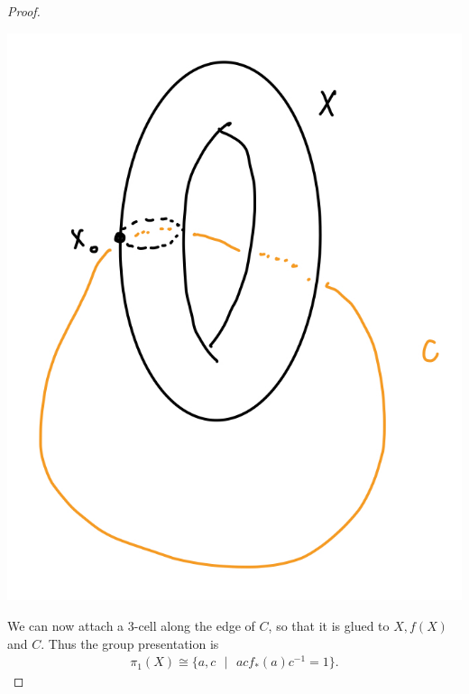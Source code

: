 \documentclass[12pt]{article}
\begin{document}
\begin{proof}
  \par \begin{center} \includegraphics[scale=.2]{5-2.jpg} \end{center} 
  \par We can now attach a 3-cell along the edge of $C$, so that it is glued to $X ,f(X)$ and $C$. Thus the group presentation is 
  \begin{align*}
    \pi_1(X) \cong \{ a,c \text{ }|\text{ } acf_*(a)c^{-1}=1 \}.
  \end{align*}
\end{proof}
\end{document}

